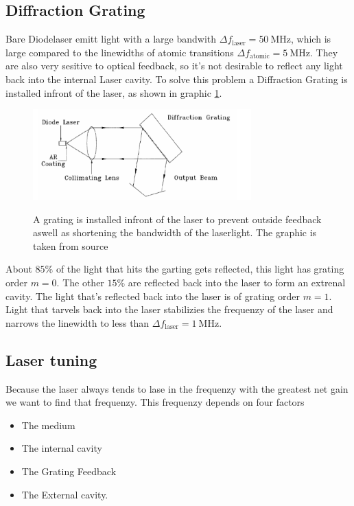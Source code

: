 \subsection{Diffraction Grating}
Bare Diodelaser emitt light with a large bandwith $\Delta f_\text{laser} = \SI{50}{\mega\Hz}$, which is large compared to the linewidths of atomic transitions $\Delta f_\text{atomic} = \SI{5}{\mega\Hz}$.
They are also very sesitive to optical feedback, so it's not desirable to reflect any light back into the internal Laser cavity.
To solve this problem a Diffraction Grating is installed infront of the laser, as shown in graphic \ref{fig:grating}.

\begin{figure}
    \centering
    \caption{A grating is installed infront of the laser to prevent outside feedback aswell as shortening the bandwidth of the laserlight. The graphic is taken from source \cite[5]{anleitung_laser}}
    \includegraphics[width=0.75\textwidth]{content/data/grating}
    \label{fig:grating}
\end{figure}

About $85\%$ of the light that hits the garting gets reflected, this light has grating order $m=0$.
The other $15\%$ are reflected back into the laser to form an extrenal cavity.
The light that's reflected back into the laser is of grating order $m=1$.
Light that tarvels back into the laser stabilizies the frequenzy of the laser and narrows the linewidth to less than $\Delta f_\text{laser} = \SI{1}{\mega\Hz}$.


\subsection{Laser tuning}
Because the laser always tends to lase in the frequenzy with the greatest net gain we want to find that frequenzy.
This frequenzy depends on four factors 

\begin{itemize}
    \item The medium
    \item The internal cavity
    \item The Grating Feedback
    \item The External cavity.
\end{itemize}

